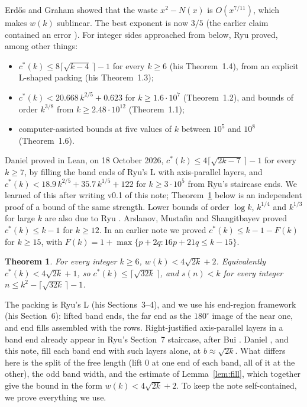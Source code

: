 \documentclass[11pt,letterpaper]{amsart}
\theoremstyle{plain}
\newtheorem{theorem}{Theorem}
\theoremstyle{remark}
\newcommand{\cs}{c^{*}}
\begin{document}
Erd\H{o}s and Graham \cite{EG75} showed that the waste $x^2-N(x)$ is $O(x^{7/11})$, which makes $w(k)$ sublinear. The best exponent is now $3/5$ \cite{Bui25,McC26} (the earlier claim \cite{CG20} contained an error \cite{AB26}). For integer sides approached from below, Ryu \cite{Ryu26} proved, among other things:
\begin{itemize}
\item $\cs(k)\le 8\lceil\sqrt{k-4}\,\rceil-1$ for every $k\ge6$ (his Theorem~1.4), from an explicit L-shaped packing (his Theorem~1.3);
\item $\cs(k)<20.668\,k^{2/5}+0.623$ for $k\ge1.6\cdot10^{7}$ (Theorem~1.2), and bounds of order $k^{3/8}$ from $k\ge2.48\cdot10^{12}$ (Theorem~1.1);
\item computer-assisted bounds at five values of $k$ between $10^5$ and $10^8$ (Theorem~1.6).
\end{itemize}
Daniel \cite{Dan26b} proved in Lean, on 18 October 2026, $\cs(k)\le4\lceil\sqrt{2k-7}\,\rceil-1$ for every $k\ge7$, by filling the band ends of Ryu's L with axis-parallel layers, and $\cs(k)<18.9\,k^{2/5}+35.7\,k^{1/5}+122$ for $k\ge3\cdot10^5$ from Ryu's staircase ends. We learned of this after writing v0.1 of this note; Theorem~\ref{thm:A} below is an independent proof of a bound of the same strength. Lower bounds of order $\log k$, $k^{1/4}$ and $k^{1/3}$ for large $k$ are also due to Ryu \cite{Ryu26b}. Arslanov, Mustafin and Shangitbayev \cite{AMS21} proved $\cs(k)\le k-1$ for $k\ge12$. In an earlier note \cite{Fan26a} we proved $\cs(k)\le k-1-F(k)$ for $k\ge15$, with $F(k)=1+\max\{p+2q:16p+21q\le k-15\}$.

\begin{theorem}\label{thm:A}
For every integer $k\ge6$, $w(k)<4\sqrt{2k}+2$. Equivalently $\cs(k)<4\sqrt{2k}+1$, so $\cs(k)\le\lceil\sqrt{32k}\,\rceil$, and $s(n)<k$ for every integer $n\le k^2-\lceil\sqrt{32k}\,\rceil-1$.
\end{theorem}

The packing is Ryu's L (his Sections~3--4), and we use his end-region framework (his Section~6): lifted band ends, the far end as the $180^\circ$ image of the near one, and end fills assembled with the rows. Right-justified axis-parallel layers in a band end already appear in Ryu's Section~7 staircase, after Bui \cite{Bui25}. Daniel \cite{Dan26b}, and this note, fill each band end with such layers alone, at $b\approx\sqrt{2k}$. What differs here is the split of the free length (lift $0$ at one end of each band, all of it at the other), the odd band width, and the estimate of Lemma~\ref{lem:fill}, which together give the bound in the form $w(k)<4\sqrt{2k}+2$. To keep the note self-contained, we prove everything we use.
\end{document}
